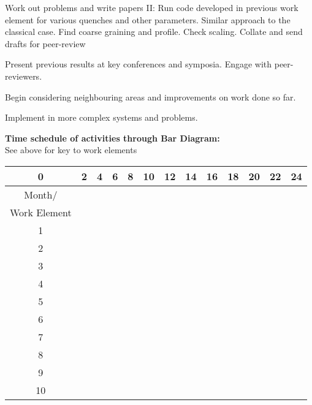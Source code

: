 \documentclass[a4paper,11pt,color]{article}
\begin{document}
\begin{enumerate}
{\item
Work out problems and write papers II: Run code developed in previous work element for various quenches and other parameters. Similar approach to the classical case. Find coarse graining and profile. Check scaling. Collate and send drafts for peer-review
\item
Present previous results at key conferences and symposia. Engage with peer-reviewers.
\item
Begin considering neighbouring areas and improvements on work done so far.
\item
Implement in more complex systems and problems.
}\end{enumerate}
\newpage
\textbf{Time schedule of activities through Bar Diagram:} \\

See above for key to work elements\\

\begin{tabular}{|c|c|c|c|c|c|c|c|c|c|c|c|c|}
\hline
0 & 2 & 4 & 6 & 8 & 10 & 12 & 14 & 16 & 18 & 20 & 22 & 24 \\
\hline
Month/ & & & & & & & & & & & & \\
Work Element & & & & & & & & & & & &  \\
\hline
1 & \cellcolor[gray]{0} & & & & & & & & & & & \\
\hline
2 & & \cellcolor[gray]{0}& & & & & & & & & &   \\
\hline
3 & & & \cellcolor[gray]{0} &\cellcolor[gray]{0} & & & & & & & & \\
\hline
4 & & & & \cellcolor[gray]{0}& \cellcolor[gray]{0}& & & & & & & \\
\hline
5 & & & & & &\cellcolor[gray]{0} & & & & & & \\
\hline
6 &  &  &  &  &  &\cellcolor[gray]{0}   &\cellcolor[gray]{0}  & \cellcolor[gray]{0} &  &  & &  \\
\hline
7 &  &  &  &  &  &  &  & \cellcolor[gray]{0}& \cellcolor[gray]{0}  &  & &  \\
\hline
8 &  &  &  &  &  &  &  & & &\cellcolor[gray]{0}   &  &  \\
\hline
9 &  &  &  &  &  &  &  & & & \cellcolor[gray]{0} &\cellcolor[gray]{0}  &  \\
\hline
10 &  &  &  &  &  &  &  & & & & \cellcolor[gray]{0}&\cellcolor[gray]{0}   \\
\hline
\end{tabular}
\end{document}
